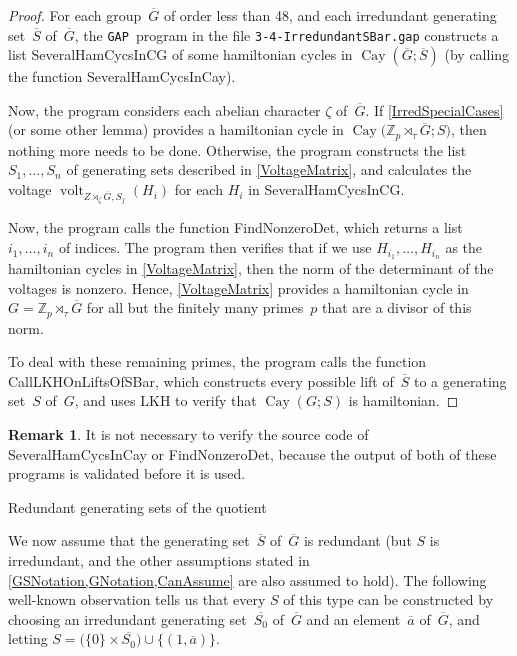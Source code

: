 \documentclass[]{amcjoucc}
\makeatletter
\theoremstyle{plain}
\theoremstyle{definition}
\theoremstyle{definition}
\newtheorem{rem}[equation]{Remark}
\newenvironment{justification}{\begingroup \renewcommand{\proofname}{Justification}\begin{proof}}{\end{proof}\endgroup}
\DeclareMathOperator{\Cay}{Cay}
\DeclareMathOperator{\volt}{volt}
\newcommand{\quot}{\overline}
\newcommand{\GAP}{\filename{GAP}}
\newcommand{\ZZ}{\mathbb{Z}}
\newcommand{\filename}[1]{\texttt{#1}}
\newcommand{\function}[1]{\textsf{#1}}
\renewcommand{\section}{%
\@startsection{section}{1}{0pt}{-\baselineskip}{0.5\baselineskip}{\large\bfseries}%
}
\makeatother
\begin{document}
\begin{justification} 
For each group~$\quot G$ of order less than 48, and each irredundant generating set~$\quot S$ of~$\quot G$, the \GAP\ program in the file \filename{3-4-IrredundantSBar.gap} constructs a list \function{SeveralHamCycsInCG} of some hamiltonian cycles in $\Cay(\quot G; \quot S)$ (by calling the function \function{SeveralHamCycsInCay}). 

Now, the program considers each abelian character $\zeta$ of~$\quot G$. 
If \cref{IrredSpecialCases} (or some other lemma) provides a hamiltonian cycle in $\Cay \bigl( \ZZ_p \rtimes_\tau \quot G; S \bigr)$, then nothing more needs to be done. Otherwise, the program constructs the list $S_1,\ldots,S_n$ of generating sets described in \cref{VoltageMatrix}, and calculates the voltage $\volt_{Z \rtimes_\zeta \quot G, S_j}(H_i)$ for each $H_i$ in \function{SeveralHamCycsInCG}.

Now, the program calls the function \function{FindNonzeroDet}, which returns a list $i_1,\ldots,i_n$ of indices. The program then verifies that if we use $H_{i_1},\ldots,H_{i_n}$ as the hamiltonian cycles in \cref{VoltageMatrix}, then the norm of the determinant of the voltages  is nonzero. Hence, \cref{VoltageMatrix} provides a hamiltonian cycle in $G = \ZZ_p \rtimes_\tau \quot G$ for all but the finitely many primes~$p$ that are a divisor of this norm.

To deal with these remaining primes, the program calls the function \function{CallLKHOnLiftsOfSBar}, which constructs every possible lift of~$\quot S$ to a generating set~$S$ of~$G$, and uses \function{LKH} to verify that $\Cay(G;S)$ is hamiltonian.
\end{justification}

\begin{rem}
It is not necessary to verify the source code of \function{SeveralHamCycsInCay} or \function{FindNonzeroDet}, because the output of both of these programs is validated before it is used.
\end{rem}





\section{Redundant generating sets of the quotient} 

We now assume that the generating set~$\quot S$ of~$\quot G$ is redundant (but $S$ is irredundant, and the other assumptions stated in \cref{GSNotation,GNotation,CanAssume} are also assumed to hold). The following well-known observation tells us that every $S$ of this type can be constructed by choosing an irredundant generating set~$\quot{S_0}$ of~$\quot G$ and an element~$\quot a$ of~$\quot G$, and letting $S = \bigl( \{0\} \times \quot{S_0} \bigr) \cup \{(1,\quot a)\}$.
\end{document}
